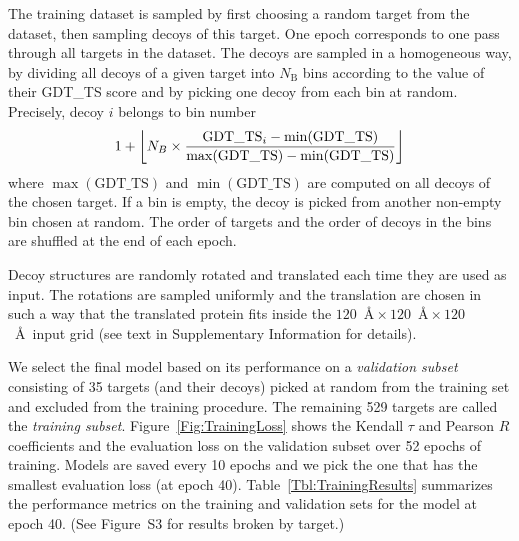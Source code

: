 \documentclass{bioinfo}
\DeclarePairedDelimiter\floor{\lfloor}{\rfloor}
\begin{document}
The training dataset is sampled by first choosing a random target from
the dataset, then sampling decoys of this target. One epoch
corresponds to one pass through all targets in the dataset. The decoys
are sampled in a homogeneous way, by dividing all decoys of a given
target into $N_\text{B}$ bins according to the value of their GDT\_TS score
and by picking one decoy from each bin at random.
Precisely, decoy $i$ belongs to bin number 
\begin{equation}
1 + \floor*{ N_B \times \frac{\text{GDT\_TS}_i - \min(\text{GDT\_TS}) }{\max(\text{GDT\_TS}) - \min(\text{GDT\_TS})} }
\end{equation}
where $\max(\text{GDT\_TS})$ and $\min(\text{GDT\_TS})$ are computed
on all decoys of the chosen target.  If a bin
is empty, the decoy is picked from another non-empty bin chosen at
random.  The order of targets and the order of decoys in the bins are
shuffled at the end of each epoch.

Decoy structures are randomly rotated and translated each time they
are used as input. The rotations are sampled uniformly
\citep{shoemake1992uniform} and the translation are chosen in such a
way that the translated protein fits inside the $120$~\AA${}\times
120$~\AA${}\times 120$~\AA\ input grid (see text in Supplementary
Information for details).

We select the final model based on its performance on a
\emph{validation subset} consisting of 35 targets (and their decoys)
picked at random from the training set and excluded from the training
procedure. The remaining 529 targets are called the \emph{training
subset}.  Figure~\ref{Fig:TrainingLoss} shows the Kendall $\tau$ and
Pearson $R$ coefficients and the evaluation loss on the validation subset over 52
epochs of training.  Models are saved every 10 epochs and we pick the
one that has the smallest evaluation loss (at epoch 40).
Table~\ref{Tbl:TrainingResults} summarizes the performance metrics on
the training and validation sets for the model at epoch 40.
(See Figure~S3 for results broken by target.)
\end{document}
